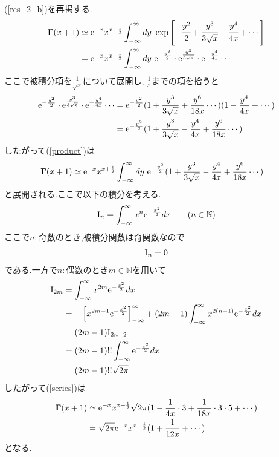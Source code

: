 \subsection{}
(\ref{res_2_b})を再掲する.
\setcounter{equation}{14}
\begin{align}
  {\bf\Gamma}(x+1)&\simeq{\rm e}^{-x}x^{x+\frac{1}{2}}\int^{\infty}_{-\infty}dy\ \exp\left[-\cfrac{y^2}{2}+\cfrac{y^3}{3\sqrt{x}}-\cfrac{y^4}{4x}+\cdots\right]\\
  \label{product}
  &={\rm e}^{-x}x^{x+\frac{1}{2}}\int^{\infty}_{-\infty}dy\ {\rm e}^{-\frac{y^2}{2}}\cdot{\rm e}^{\frac{y^3}{3\sqrt{x}}}\cdot{\rm e}^{-\frac{y^4}{4x}}\cdots
\end{align}
ここで被積分項を$\frac{1}{\sqrt{x}}$について展開し, $\frac{1}{x}$までの項を拾うと
\begin{align}
  {\rm e}^{-\frac{y^2}{2}}\cdot{\rm e}^{\frac{y^3}{3\sqrt{x}}}\cdot{\rm e}^{-\frac{y^4}{4x}}\cdots
  &={\rm e}^{-\frac{y^2}{2}}(1+\frac{y^3}{3\sqrt{x}}+\frac{y^6}{18x}\cdots)(1-\frac{y^4}{4x}+\cdots)\\
  &={\rm e}^{-\frac{y^2}{2}}(1+\frac{y^3}{3\sqrt{x}}-\frac{y^4}{4x}+\frac{y^6}{18x}\cdots)
\end{align}
したがって(\ref{product})は
\begin{align}
  \label{series}
  {\bf\Gamma}(x+1)&\simeq{\rm e}^{-x}x^{x+\frac{1}{2}}\int^{\infty}_{-\infty}dy\ {\rm e}^{-\frac{y^2}{2}}(1+\frac{y^3}{3\sqrt{x}}-\frac{y^4}{4x}+\frac{y^6}{18x}\cdots)
\end{align}
と展開される.ここで以下の積分を考える.
\begin{align}
  {\rm I}_n=\int^{\infty}_{-\infty}x^n{\rm e}^{-\frac{x^2}{2}}dx\qquad(n\in\mathbb{N})
\end{align}
ここで$n:奇数$のとき,被積分関数は奇関数なので
\begin{align}
  {\rm I}_n=0
\end{align}
である.一方で$n:偶数$のとき$m\in\mathbb{N}$を用いて
\begin{align}
  {\rm I}_{2m}&=\int^{\infty}_{-\infty}x^{2m}{\rm e}^{-\frac{x^2}{2}}dx\\
  &=-\left[x^{2m-1}{\rm e}^{-\frac{x^2}{2}}\right]^{\infty}_{-\infty}+(2m-1)\int^{\infty}_{-\infty}x^{2(n-1)}{\rm e}^{-\frac{x^2}{2}}dx\\
  &=(2m-1){\rm I}_{2n-2}\\
  &=(2m-1)!!\int^{\infty}_{-\infty}{\rm e}^{-\frac{x^2}{2}}dx\\
  &=(2m-1)!!\sqrt{2\pi}
\end{align}
したがって(\ref{series})は
\begin{align}
  {\bf\Gamma}(x+1)&\simeq{\rm e}^{-x}x^{x+\frac{1}{2}}\sqrt{2\pi}(1-\frac{1}{4x}\cdot 3+\frac{1}{18x}\cdot 3\cdot 5+\cdots)\\
  &=\sqrt{2\pi}{\rm e}^{-x}x^{x+\frac{1}{2}}(1+\frac{1}{12x}+\cdots)
\end{align}
となる.